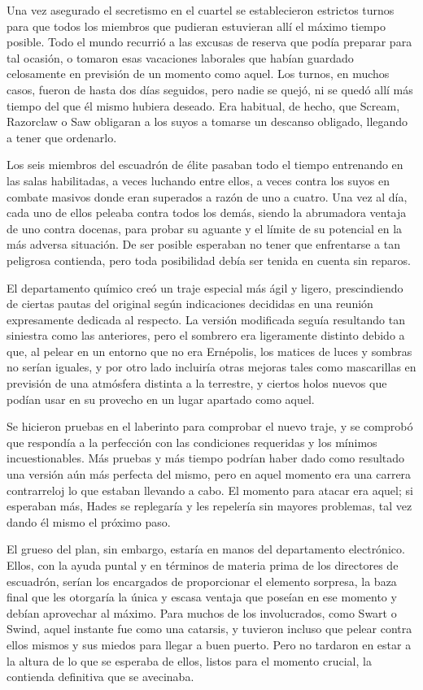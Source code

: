 Una vez asegurado el secretismo en el cuartel se establecieron estrictos turnos para que todos los miembros que pudieran estuvieran allí el máximo tiempo posible. Todo el mundo recurrió a las excusas de reserva que podía preparar para tal ocasión, o tomaron esas vacaciones laborales que habían guardado celosamente en previsión de un momento como aquel. Los turnos, en muchos casos, fueron de hasta dos días seguidos, pero nadie se quejó, ni se quedó allí más tiempo del que él mismo hubiera deseado. Era habitual, de hecho, que Scream, Razorclaw o Saw obligaran a los suyos a tomarse un descanso obligado, llegando a tener que ordenarlo.

Los seis miembros del escuadrón de élite pasaban todo el tiempo entrenando en las salas habilitadas, a veces luchando entre ellos, a veces contra los suyos en combate masivos donde eran superados a razón de uno a cuatro. Una vez al día, cada uno de ellos peleaba contra todos los demás, siendo la abrumadora ventaja de uno contra docenas, para probar su aguante y el límite de su potencial en la más adversa situación. De ser posible esperaban no tener que enfrentarse a tan peligrosa contienda, pero toda posibilidad debía ser tenida en cuenta sin reparos.

El departamento químico creó un traje especial más ágil y ligero, prescindiendo de ciertas pautas del original según indicaciones decididas en una reunión expresamente dedicada al respecto. La versión modificada seguía resultando tan siniestra como las anteriores, pero el sombrero era ligeramente distinto debido a que, al pelear en un entorno que no era Ernépolis, los matices de luces y sombras no serían iguales, y por otro lado incluiría otras mejoras tales como mascarillas en previsión de una atmósfera distinta a la terrestre, y ciertos holos nuevos que podían usar en su provecho en un lugar apartado como aquel.

Se hicieron pruebas en el laberinto para comprobar el nuevo traje, y se comprobó que respondía a la perfección con las condiciones requeridas y los mínimos incuestionables. Más pruebas y más tiempo podrían haber dado como resultado una versión aún más perfecta del mismo, pero en aquel momento era una carrera contrarreloj lo que estaban llevando a cabo. El momento para atacar era aquel; si esperaban más, Hades se replegaría y les repelería sin mayores problemas, tal vez dando él mismo el próximo paso.

El grueso del plan, sin embargo, estaría en manos del departamento electrónico. Ellos, con la ayuda puntal y en términos de materia prima de los directores de escuadrón, serían los encargados de proporcionar el elemento sorpresa, la baza final que les otorgaría la única y escasa ventaja que poseían en ese momento y debían aprovechar al máximo. Para muchos de los involucrados, como Swart o Swind, aquel instante fue como una catarsis, y tuvieron incluso que pelear contra ellos mismos y sus miedos para llegar a buen puerto. Pero no tardaron en estar a la altura de lo que se esperaba de ellos, listos para el momento crucial, la contienda definitiva que se avecinaba.

